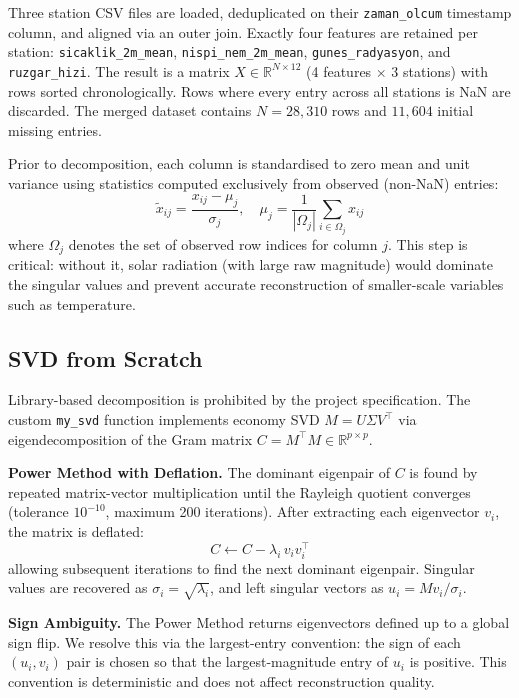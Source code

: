 \documentclass[conference]{IEEEtran}
\begin{document}
Three station CSV files are loaded, deduplicated on their \texttt{zaman\_olcum} timestamp column, and aligned via an outer join. Exactly four features are retained per station: \texttt{sicaklik\_2m\_mean}, \texttt{nispi\_nem\_2m\_mean}, \texttt{gunes\_radyasyon}, and \texttt{ruzgar\_hizi}. The result is a matrix $X \in \mathbb{R}^{N \times 12}$ (4 features $\times$ 3 stations) with rows sorted chronologically. Rows where every entry across all stations is NaN are discarded. The merged dataset contains $N = 28{,}310$ rows and $11{,}604$ initial missing entries.

Prior to decomposition, each column is standardised to zero mean and unit variance using statistics computed exclusively from observed (non-NaN) entries:
\begin{equation}
    \tilde{x}_{ij} = \frac{x_{ij} - \mu_j}{\sigma_j}, \quad \mu_j = \frac{1}{|\Omega_j|}\sum_{i \in \Omega_j} x_{ij}
\end{equation}
where $\Omega_j$ denotes the set of observed row indices for column $j$. This step is critical: without it, solar radiation (with large raw magnitude) would dominate the singular values and prevent accurate reconstruction of smaller-scale variables such as temperature.

\subsection{SVD from Scratch}

Library-based decomposition is prohibited by the project specification. The custom \texttt{my\_svd} function implements economy SVD $M = U \Sigma V^\top$ via eigendecomposition of the Gram matrix $C = M^\top M \in \mathbb{R}^{p \times p}$.

\textbf{Power Method with Deflation.} The dominant eigenpair of $C$ is found by repeated matrix-vector multiplication until the Rayleigh quotient converges (tolerance $10^{-10}$, maximum 200 iterations). After extracting each eigenvector $v_i$, the matrix is deflated:
\begin{equation}
    C \leftarrow C - \lambda_i \, v_i v_i^\top
\end{equation}
allowing subsequent iterations to find the next dominant eigenpair. Singular values are recovered as $\sigma_i = \sqrt{\lambda_i}$, and left singular vectors as $u_i = M v_i / \sigma_i$.

\textbf{Sign Ambiguity.} The Power Method returns eigenvectors defined up to a global sign flip. We resolve this via the largest-entry convention: the sign of each $(u_i, v_i)$ pair is chosen so that the largest-magnitude entry of $u_i$ is positive. This convention is deterministic and does not affect reconstruction quality.
\end{document}
